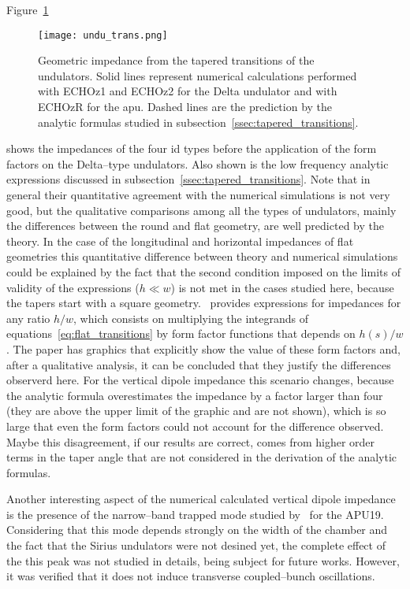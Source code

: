     Figure~\ref{fig:undu_trans}
    \begin{figure}[b]
        \centering
        \texttt{[image: undu\_trans.png]}
        \caption{Geometric impedance from the tapered transitions of the undulators. Solid lines represent numerical calculations performed with ECHOz1 and ECHOz2 for the Delta undulator and with ECHOzR for the \gls{apu}. Dashed lines are the prediction by the analytic formulas studied in subsection~\ref{ssec:tapered_transitions}.}
        \label{fig:undu_trans}
    \end{figure}
    shows the impedances of the four \gls{id} types before the application of the form factors on the Delta--type undulators. Also shown is the low frequency analytic expressions discussed in subsection~\ref{ssec:tapered_transitions}. Note that in general their quantitative agreement with the numerical simulations is not very good, but the qualitative comparisons among all the types of undulators, mainly the differences between the round and flat geometry, are well predicted by the theory. In the case of the longitudinal and horizontal impedances of flat geometries this quantitative difference between theory and numerical simulations could be explained by the fact that the second condition imposed on the limits of validity of the expressions ($h\ll w$) is not met in the cases studied here, because the tapers start with a square geometry.~ provides expressions for impedances for any ratio $h/w$, which consists on multiplying the integrands of equations~\eqref{eq:flat_transitions} by form factor functions that depends on $h(s)/w$. The paper has graphics that explicitly show the value of these form factors and, after a qualitative analysis, it can be concluded that they justify the differences observerd here. For the vertical dipole impedance this scenario changes, because the analytic formula overestimates the impedance by a factor larger than four (they are above the upper limit of the graphic and are not shown), which is so large that even the form factors could not account for the difference observed. Maybe this disagreement, if our results are correct, comes from higher order terms in the taper angle that are not considered in the derivation of the analytic formulas.

    Another interesting aspect of the numerical calculated vertical dipole impedance is the presence of the narrow--band trapped mode studied by~ for the APU19. Considering that this mode depends strongly on the width of the chamber and the fact that the Sirius undulators were not desined yet, the complete effect of the this peak was not studied in details, being subject for future works. However, it was verified that it does not induce transverse coupled--bunch oscillations.

